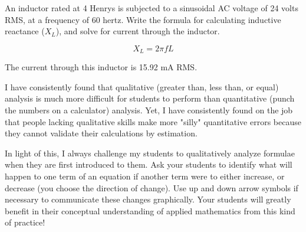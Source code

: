 

An inductor rated at 4 Henrys is subjected to a sinusoidal AC voltage of 24 volts RMS, at a frequency of 60 hertz.  Write the formula for calculating inductive reactance ($X_L$), and solve for current through the inductor.







$$X_L = 2 \pi f L$$

The current through this inductor is 15.92 mA RMS.







I have consistently found that qualitative (greater than, less than, or equal) analysis is much more difficult for students to perform than quantitative (punch the numbers on a calculator) analysis.  Yet, I have consistently found on the job that people lacking qualitative skills make more "silly" quantitative errors because they cannot validate their calculations by estimation.

In light of this, I always challenge my students to qualitatively analyze formulae when they are first introduced to them.  Ask your students to identify what will happen to one term of an equation if another term were to either increase, or decrease (you choose the direction of change).  Use up and down arrow symbols if necessary to communicate these changes graphically.  Your students will greatly benefit in their conceptual understanding of applied mathematics from this kind of practice!



